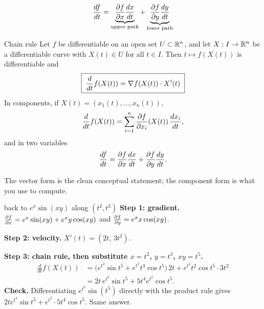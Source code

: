 \begin{center}

\[
\frac{df}{dt}=\underbrace{\frac{\partial f}{\partial x}\frac{dx}{dt}}_{\text{upper path}}+\underbrace{\frac{\partial f}{\partial y}\frac{dy}{dt}}_{\text{lower path}}
\]
\end{center}

\begin{theorem}[label=thm:chain]{Chain rule}
Let $f$ be differentiable on an open set $U\subset\mathbb{R}^n$, and let $X:I\to\mathbb{R}^n$ be a
differentiable curve with $X(t)\in U$ for all $t\in I$. Then $t\mapsto f(X(t))$ is
differentiable and
\[
\boxed{\;\frac{d}{dt}f(X(t))=\nabla f(X(t))\cdot X'(t)\;}
\]
In components, if $X(t)=(x_1(t),\dots,x_n(t))$,
\[
\frac{d}{dt}f(X(t))=\sum_{i=1}^n\frac{\partial f}{\partial x_i}(X(t))\,\frac{dx_i}{dt},
\]
and in two variables
\[
\frac{df}{dt}=\frac{\partial f}{\partial x}\frac{dx}{dt}+\frac{\partial f}{\partial y}\frac{dy}{dt}.
\]
\end{theorem}

The vector form is the clean conceptual statement; the component form is what you use
to compute.

\begin{example}{back to $e^{x}\sin(xy)$ along $(t^2,t^3)$}
\textbf{Step 1: gradient.} $\frac{\partial f}{\partial x}=e^x\sin(xy)+e^xy\cos(xy)$ and $\frac{\partial f}{\partial y}=e^xx\cos(xy)$.

\textbf{Step 2: velocity.} $X'(t)=(2t,\,3t^2)$.

\textbf{Step 3: chain rule, then substitute $x=t^2$, $y=t^3$, $xy=t^5$.}
\begin{align*}
\frac{d}{dt}f(X(t))&=\big(e^{t^2}\sin t^5+e^{t^2}t^3\cos t^5\big)\,2t+e^{t^2}t^2\cos t^5\cdot 3t^2\\
&=2t\,e^{t^2}\sin t^5+5t^4e^{t^2}\cos t^5 .
\end{align*}
\textbf{Check.} Differentiating $e^{t^2}\sin(t^5)$ directly with the product rule gives
$2te^{t^2}\sin t^5+e^{t^2}\cdot5t^4\cos t^5$. Same answer.
\end{example}

